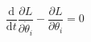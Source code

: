 \documentclass{article}
\begin{document}
	
\[
\dfrac{\text{d}}{\text{d}t} \dfrac{\partial L}{\partial \dot{\theta}_i} - \dfrac{\partial{L}}{\partial \theta_i} = 0\,
\]
\end{document}
